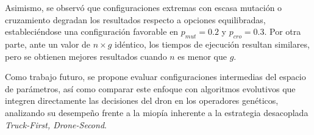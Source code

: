 Asimismo, se observó que configuraciones extremas con escasa mutación o cruzamiento degradan los resultados respecto a opciones equilibradas, estableciéndose una configuración favorable en $p_{mut} = 0.2$ y $p_{cro} = 0.3$.
Por otra parte, ante un valor de $n \times g$ idéntico, los tiempos de ejecución resultan similares, pero se obtienen mejores resultados cuando $n$ es menor que $g$.

Como trabajo futuro, se propone evaluar configuraciones intermedias del espacio de parámetros, así como comparar este enfoque con algoritmos evolutivos que integren directamente las decisiones del dron en los operadores genéticos, analizando su desempeño frente a la miopía inherente a la estrategia desacoplada \textit{Truck-First, Drone-Second}.
